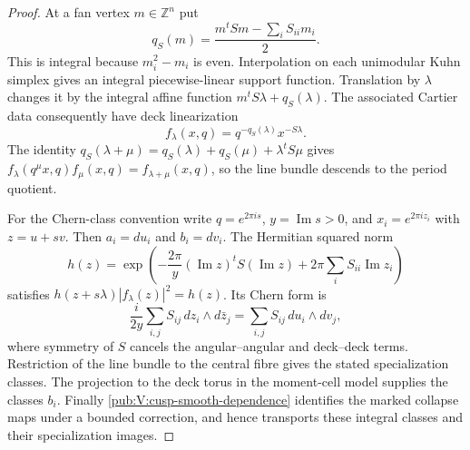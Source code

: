 \documentclass[11pt,a4paper]{article}
\numberwithin{equation}{section}
\theoremstyle{definition}
\begin{document}
\begin{proof}
At a fan vertex $m\in\mathbb Z^n$ put
\[
 q_S(m)=\frac{m^tSm-\sum_iS_{ii}m_i}{2}.
\]
This is integral because $m_i^2-m_i$ is even. Interpolation on
each unimodular Kuhn simplex gives an integral piecewise-linear
support function. Translation by $\lambda$ changes it by the
integral affine function $m^tS\lambda+q_S(\lambda)$.
The associated Cartier data consequently have deck linearization
\[
 f_\lambda(x,q)=q^{-q_S(\lambda)}x^{-S\lambda}.
\]
The identity
$q_S(\lambda+\mu)=q_S(\lambda)+q_S(\mu)+\lambda^tS\mu$
gives $f_\lambda(q^\mu x,q)f_\mu(x,q)=f_{\lambda+\mu}(x,q)$,
so the line bundle descends to the period quotient.

For the Chern-class convention write $q=e^{2\pi i s}$,
$y=\operatorname{Im}s>0$, and $x_i=e^{2\pi iz_i}$ with
$z=u+sv$. Then $a_i=du_i$ and $b_i=dv_i$.
The Hermitian squared norm
\[
 h(z)=\exp\!\left(-\frac{2\pi}{y}
 (\operatorname{Im}z)^tS(\operatorname{Im}z)
 +2\pi\sum_iS_{ii}\operatorname{Im}z_i\right)
\]
satisfies $h(z+s\lambda)|f_\lambda(z)|^2=h(z)$.
Its Chern form is
\[
 \frac{i}{2y}\sum_{i,j}S_{ij}\,dz_i\wedge d\bar z_j
 =\sum_{i,j}S_{ij}\,du_i\wedge dv_j,
\]
where symmetry of $S$ cancels the angular--angular and deck--deck
terms. Restriction of the line bundle to the central fibre gives
the stated specialization classes. The projection to the deck torus
in the moment-cell model supplies the classes $b_i$.
Finally \cref{pub:V:cusp-smooth-dependence} identifies the marked
collapse maps under a bounded correction, and hence transports
these integral classes and their specialization images.
\end{proof}
\end{document}
